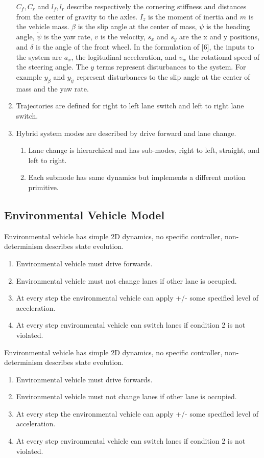 \begin{enumerate}
	\(C_f,C_r\) and \(l_f, l_r\) describe respectively the cornering stiffness and distances from the center of gravity to the axles. \(I_z\) is the moment of inertia and \(m\) is the vehicle mass. \(\beta\) is the slip angle at the center of mass, \(\psi\) is the heading angle, \(\dot{\psi}\) is the yaw rate, \(v\) is the velocity, \(s_x\) and \(s_y\) are the x and y positions, and \(\delta\) is the angle of the front wheel. In the formulation of [6], the inputs to the system are \(a_x\), the logitudinal acceleration, and \(v_w\) the rotational speed of the steering angle. The \(y\) terms represent disturbances to the system. For example \(y_{\beta}\) and \(y_{\dot{\psi}}\) represent disturbances to the slip angle at the center of mass and the yaw rate. 
	\item Trajectories are defined for right to left lane switch and left to right lane switch.
	\item Hybrid system modes are described by drive forward and lane change.
	\begin{enumerate}
		\item Lane change is hierarchical and has sub-modes, right to left, straight, and left to right.
		\item Each submode has same dynamics but implements a different motion primitive.
	\end{enumerate}
\end{enumerate}
\subsection{Environmental Vehicle Model}
Environmental vehicle has simple 2D dynamics, no specific controller, non-determinism describes state evolution.
\begin{enumerate}
	\item Environmental vehicle must drive forwards.
	\item Environmental vehicle must not change lanes if other lane is occupied.
	\item At every step the environmental vehicle can apply +/- some specified level of acceleration.
	\item At every step environmental vehicle can switch lanes if condition 2 is not violated.
\end{enumerate}
Environmental vehicle has simple 2D dynamics, no specific controller, non-determinism describes state evolution.
\begin{enumerate}
	\item Environmental vehicle must drive forwards.
	\item Environmental vehicle must not change lanes if other lane is occupied.
	\item At every step the environmental vehicle can apply +/- some specified level of acceleration.
	\item At every step environmental vehicle can switch lanes if condition 2 is not violated.
\end{enumerate}
